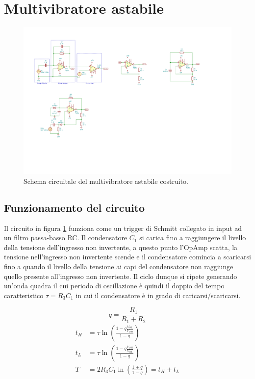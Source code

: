 \documentclass[10pt,a4paper]{article}
\begin{document}
\section{Multivibratore astabile}

\begin{figure}[htbp]
    \centering
	\includegraphics[scale=1.5]{astable}
    \caption{Schema circuitale del multivibratore astabile costruito.
    \label{fig: astableschm}}
\end{figure}

\subsection{Funzionamento del circuito}
Il circuito in figura \ref{fig: astableschm} funziona come un trigger di
Schmitt collegato in input ad un filtro passa-basso RC. Il condensatore $C_1$ si
carica fino a raggiungere il livello della tensione dell’ingresso non
invertente, a questo punto l’OpAmp scatta, la tensione nell’ingresso non invertente
scende e il condensatore comincia a scaricarsi fino a quando il livello della
tensione ai capi del condensatore non raggiunge quello presente all’ingresso
non invertente.
Il ciclo dunque si ripete generando un'onda quadra il cui periodo di
oscillazione è quindi il doppio del tempo caratteristico $\tau = R_3 C_1$ in
cui il condensatore è in grado di caricarsi/scaricarsi.

\[
q = \frac{R_1}{R_1 + R_2}
\]
\begin{align}
t_H &= \tau \ln\left(\frac{1 - q\frac{V_{OL}}{V_{OH}}}{1-q}\right) \\
t_L &= \tau \ln\left(\frac{1 - q\frac{V_{OH}}{V_{OL}}}{1-q}\right) \\
T &= 2 R_3 C_1 \ln\left(\frac{1 + q}{1 - q}\right) = t_H + t_L
\end{align}
\end{document}
